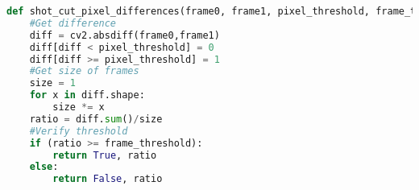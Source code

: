 \documentclass[journal]{IEEEtran}
\begin{document}
\begin{lstlisting}[language=Python, caption=Function that calculates whether a frame and its precedessor have a difference that can be considered as a change of shot., label=list:shot_cut_pixel_differences_function]
def shot_cut_pixel_differences(frame0, frame1, pixel_threshold, frame_threshold):
	#Get difference
	diff = cv2.absdiff(frame0,frame1)
	diff[diff < pixel_threshold] = 0
	diff[diff >= pixel_threshold] = 1
	#Get size of frames
	size = 1
	for x in diff.shape:
		size *= x
	ratio = diff.sum()/size
	#Verify threshold
	if (ratio >= frame_threshold):
		return True, ratio
	else:
		return False, ratio
\end{lstlisting}



\end{document}
